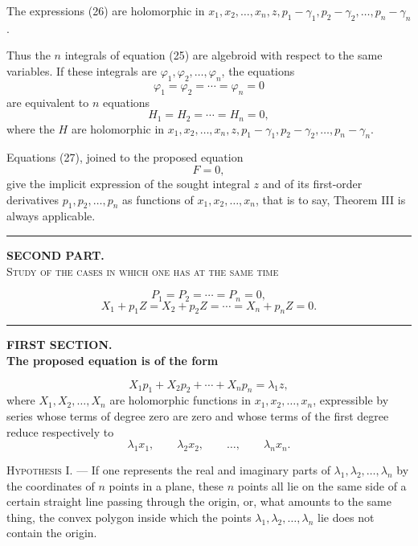 \documentclass[11pt]{article}
\newcommand{\shortline}{\begin{center}\rule{3.5em}{0.4pt}\end{center}}
\begin{document}
The expressions (26) are holomorphic in $x_1,x_2,\ldots,x_n,z,p_1-\gamma_1,p_2-\gamma_2,\ldots,p_n-\gamma_n$.

Thus the $n$ integrals of equation (25) are algebroid with respect to the same variables. If these integrals are $\varphi_1,\varphi_2,\ldots,\varphi_n$, the equations
\[
\varphi_1=\varphi_2=\cdots=\varphi_n=0
\]
are equivalent to $n$ equations
\begin{equation*}\tag{27}
H_1=H_2=\cdots=H_n=0,
\end{equation*}
where the $H$ are holomorphic in $x_1,x_2,\ldots,x_n,z,p_1-\gamma_1,p_2-\gamma_2,\ldots,p_n-\gamma_n$.

Equations (27), joined to the proposed equation
\[
F=0,
\]
give the implicit expression of the sought integral $z$ and of its first-order derivatives $p_1,p_2,\ldots,p_n$ as functions of $x_1,x_2,\ldots,x_n$, that is to say, Theorem III is always applicable.

\shortline

\begin{center}
{\bfseries SECOND PART.}\\[0.8em]
{\scshape Study of the cases in which one has at the same time}
\end{center}
\[
P_1=P_2=\cdots=P_n=0,
\]
\[
X_1+p_1Z=X_2+p_2Z=\cdots=X_n+p_nZ=0.
\]

\shortline

\begin{center}
{\bfseries FIRST SECTION.}\\[0.8em]
{\bfseries The proposed equation is of the form}
\end{center}

\begin{equation*}\tag{1}
X_1p_1+X_2p_2+\cdots+X_np_n=\lambda_1z,
\end{equation*}
where $X_1,X_2,\ldots,X_n$ are holomorphic functions in $x_1,x_2,\ldots,x_n$, expressible by series whose terms of degree zero are zero and whose terms of the first degree reduce respectively to
\[
\lambda_1x_1,\qquad \lambda_2x_2,\qquad \ldots,\qquad \lambda_nx_n.
\]

\noindent\textsc{Hypothesis I.} --- If one represents the real and imaginary parts of $\lambda_1,\lambda_2,\ldots,\lambda_n$ by the coordinates of $n$ points in a plane, these $n$ points all lie on the same side of a certain straight line passing through the origin, or, what amounts to the same thing, the convex polygon inside which the points $\lambda_1,\lambda_2,\ldots,\lambda_n$ lie does not contain the origin.
\end{document}

